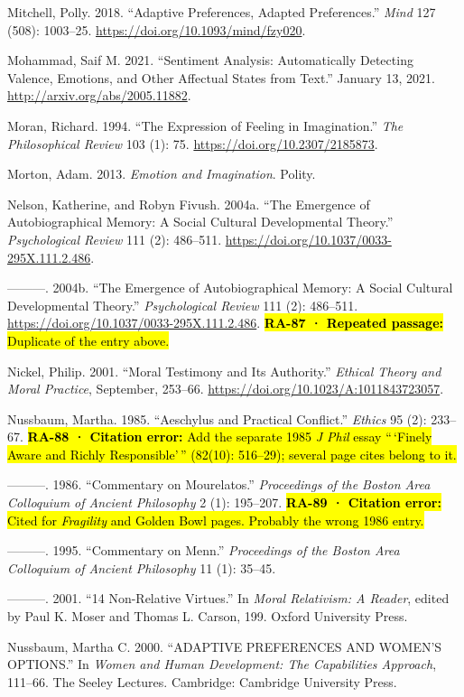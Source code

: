 \documentclass[
  letterpaper,
  DIV=11,
  numbers=noendperiod]{scrartcl}
\theoremstyle{remark}
\begin{document}
Mitchell, Polly. 2018. ``Adaptive Preferences, Adapted Preferences.''
\emph{Mind} 127 (508): 1003--25.
\url{https://doi.org/10.1093/mind/fzy020}.

Mohammad, Saif M. 2021. ``Sentiment Analysis: Automatically Detecting
Valence, Emotions, and Other Affectual States from Text.'' January 13,
2021. \url{http://arxiv.org/abs/2005.11882}.

Moran, Richard. 1994. ``The Expression of Feeling in Imagination.''
\emph{The Philosophical Review} 103 (1): 75.
\url{https://doi.org/10.2307/2185873}.

Morton, Adam. 2013. \emph{Emotion and Imagination}. Polity.

Nelson, Katherine, and Robyn Fivush. 2004a. ``The Emergence of
Autobiographical Memory: A Social Cultural Developmental Theory.''
\emph{Psychological Review} 111 (2): 486--511.
\url{https://doi.org/10.1037/0033-295X.111.2.486}.

---------. 2004b. ``The Emergence of Autobiographical Memory: A Social
Cultural Developmental Theory.'' \emph{Psychological Review} 111 (2):
486--511. \url{https://doi.org/10.1037/0033-295X.111.2.486}.
\hl{\textbf{RA-87 · Repeated passage:} Duplicate of the entry above.}

Nickel, Philip. 2001. ``Moral Testimony and Its Authority.''
\emph{Ethical Theory and Moral Practice}, September, 253--66.
\url{https://doi.org/10.1023/A:1011843723057}.

Nussbaum, Martha. 1985. ``Aeschylus and Practical Conflict.''
\emph{Ethics} 95 (2): 233--67. \hl{\textbf{RA-88 · Citation error:} Add
the separate 1985 \emph{J Phil} essay ``\,`Finely Aware and Richly
Responsible'\,'' (82(10): 516--29); several page cites belong to it.}

---------. 1986. ``Commentary on Mourelatos.'' \emph{Proceedings of the
Boston Area Colloquium of Ancient Philosophy} 2 (1): 195--207.
\hl{\textbf{RA-89 · Citation error:} Cited for \emph{Fragility} and
Golden Bowl pages. Probably the wrong 1986 entry.}

---------. 1995. ``Commentary on Menn.'' \emph{Proceedings of the Boston
Area Colloquium of Ancient Philosophy} 11 (1): 35--45.

---------. 2001. ``14 Non-Relative Virtues.'' In \emph{Moral Relativism:
A Reader}, edited by Paul K. Moser and Thomas L. Carson, 199. Oxford
University Press.

Nussbaum, Martha C. 2000. ``ADAPTIVE PREFERENCES AND WOMEN'S OPTIONS.''
In \emph{Women and Human Development: The Capabilities Approach},
111--66. The Seeley Lectures. Cambridge: Cambridge University Press.
\end{document}
